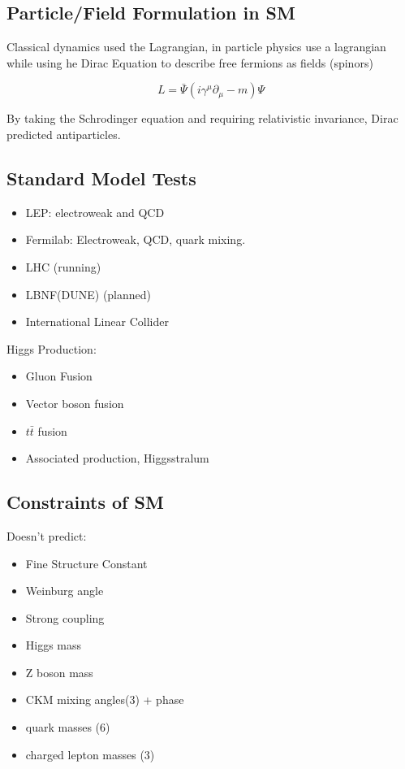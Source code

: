 \documentclass[]{article}
\begin{document}
\subsection{Particle/Field Formulation in SM}

Classical dynamics used the Lagrangian, in particle physics use a lagrangian while using he Dirac Equation to describe free fermions as fields (spinors)

\begin{equation}
L = \bar{\Psi}(i\gamma^\mu\partial_\mu - m)\Psi
\end{equation}

By taking the Schrodinger equation and requiring relativistic invariance, Dirac predicted antiparticles.

\subsection{Standard Model Tests}
\begin{itemize}
	\item LEP: electroweak and QCD
	\item Fermilab: Electroweak, QCD, quark mixing.
	\item LHC (running)
	\item LBNF(DUNE) (planned)
	\item International Linear Collider
\end{itemize}

Higgs Production:
\begin{itemize}
	\item Gluon Fusion
	\item Vector boson fusion
	\item $t\bar{t}$ fusion
	\item Associated production, Higgsstralum
\end{itemize}

\subsection{Constraints of SM}

Doesn't predict:
\begin{itemize}
	\item Fine Structure Constant
	\item Weinburg angle
	\item Strong coupling
	\item Higgs mass
	\item Z boson mass
	\item CKM mixing angles(3) + phase
	\item quark masses (6)
	\item charged lepton masses (3)
\end{itemize}
\end{document}
